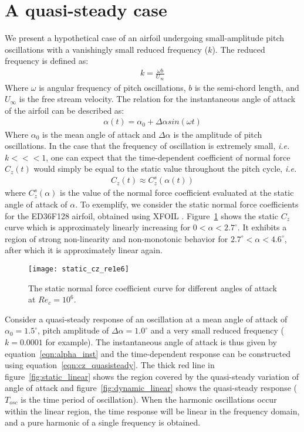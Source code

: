\section{A quasi-steady case}
We present a hypothetical case of an airfoil undergoing small-amplitude pitch oscillations with a vanishingly small reduced frequency ($k$). The reduced frequency is defined as:
\begin{align}
	k = \frac{\omega b}{U_{\infty}}
\end{align}
Where $\omega$ is angular frequency of pitch oscillations, $b$ is the semi-chord length, and $U_{\infty}$ is the free stream velocity. The relation for the instantaneous angle of attack of the airfoil can be described as:
\begin{align}
\alpha(t) = \alpha_{0} + \Delta\alpha sin(\omega t)
\label{eqn:alpha_inst}
\end{align}
Where $\alpha_{0}$ is the mean angle of attack and $\Delta\alpha$ is the amplitude of pitch oscillations. In the case that the frequency of oscillation is extremely small, \textit{i.e.} $k<<<1$, one can expect that the time-dependent coefficient of normal force $C_{z}(t)$ would simply be equal to the static value throughout the pitch cycle, \textit{i.e.}
\begin{align}
C_{z}(t) \approx C^{s}_{z}(\alpha(t))
\label{eqn:cz_quasisteady}
\end{align}
where $C^{s}_{z}(\alpha)$ is the value of the normal force coefficient evaluated at the static angle of attack of $\alpha$. To exemplify, we consider the static normal force coefficients for the ED36F128 airfoil, obtained using XFOIL \citep{drela89}. Figure~\ref{fig:cz_static} shows the static $C_{z}$ curve which is approximately linearly increasing for $0<\alpha<2.7^{\circ}$. It exhibits a region of strong non-linearity and non-monotonic behavior for $2.7^{\circ}<\alpha<4.6^{\circ}$, after which it is approximately linear again.
\begin{figure}[h]
	\centering
	\texttt{[image: static\_cz\_re1e6]}
	\caption{The static normal force coefficient curve for different angles of attack at $Re_{c}=10^{6}$.}
	\label{fig:cz_static}
\end{figure}
Consider a quasi-steady response of an oscillation at a mean angle of attack of $\alpha_{0}=1.5^{\circ}$, pitch amplitude of $\Delta\alpha=1.0^{\circ}$ and a very small reduced frequency ($k=0.0001$ for example). The instantaneous angle of attack is thus given by equation~\ref{eqn:alpha_inst} and the time-dependent response can be constructed using equation~\ref{eqn:cz_quasisteady}. The thick red line in figure~\ref{fig:static_linear} shows the region covered by the quasi-steady variation of angle of attack and figure~\ref{fig:dynamic_linear} shows the quasi-steady response ($T_{osc}$ is the time period of oscillation). When the harmonic oscillations occur within the linear region, the time response will be linear in the frequency domain, and a pure harmonic of a single frequency is obtained.
